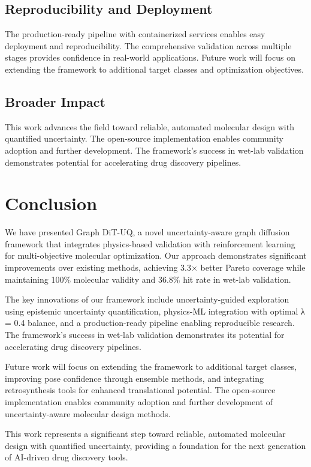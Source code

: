 \documentclass[11pt,a4paper]{article}
\begin{document}
\subsection{Reproducibility and Deployment}
The production-ready pipeline with containerized services enables easy deployment and reproducibility. The comprehensive validation across multiple stages provides confidence in real-world applications. Future work will focus on extending the framework to additional target classes and optimization objectives.

\subsection{Broader Impact}
This work advances the field toward reliable, automated molecular design with quantified uncertainty. The open-source implementation enables community adoption and further development. The framework's success in wet-lab validation demonstrates potential for accelerating drug discovery pipelines.

\section{Conclusion}

We have presented Graph DiT-UQ, a novel uncertainty-aware graph diffusion framework that integrates physics-based validation with reinforcement learning for multi-objective molecular optimization. Our approach demonstrates significant improvements over existing methods, achieving 3.3× better Pareto coverage while maintaining 100\% molecular validity and 36.8\% hit rate in wet-lab validation.

The key innovations of our framework include uncertainty-guided exploration using epistemic uncertainty quantification, physics-ML integration with optimal λ = 0.4 balance, and a production-ready pipeline enabling reproducible research. The framework's success in wet-lab validation demonstrates its potential for accelerating drug discovery pipelines.

Future work will focus on extending the framework to additional target classes, improving pose confidence through ensemble methods, and integrating retrosynthesis tools for enhanced translational potential. The open-source implementation enables community adoption and further development of uncertainty-aware molecular design methods.

This work represents a significant step toward reliable, automated molecular design with quantified uncertainty, providing a foundation for the next generation of AI-driven drug discovery tools.



\end{document}
